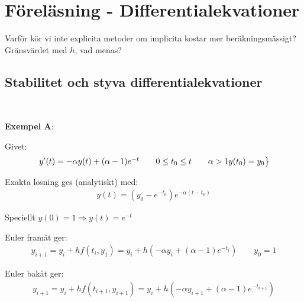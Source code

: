 \section{Föreläsning - Differentialekvationer}
\par\bigskip
\noindent Varför kör vi inte explicita metoder om implicita kostar mer beräkningsmässigt? Gränsvärdet med $h$, vad menas?
\par\bigskip
\subsection{Stabilitet och styva differentialekvationer}\hfill\\
\par\bigskip
\noindent \textbf{Exempel A}:
\par\bigskip
\noindent Givet:
\begin{equation*}
  \begin{gathered}
    \begin{rcases*}
      y^{\prime}(t)=-\alpha y(t)+(\alpha-1)e^{-t}\qquad 0\leq t_0\leq t\qquad\alpha > 1
      y(t_0)=y_0
    \end{rcases*}
  \end{gathered}
\end{equation*}
\par\bigskip
\noindent Exakta lösning ges (analytiskt) med:
\begin{equation*}
  \begin{gathered}
    y(t) = (y_0-e^{-t_0})e^{-\alpha(t-t_0)}
  \end{gathered}
\end{equation*}\par
\noindent Speciellt $y(0)=1\Rightarrow y(t)=e^{-t}$
\par\bigskip
\noindent Euler framåt ger:
\begin{equation*}
  \begin{gathered}
    y_{i+1} = y_i +hf(t_i,y_1) = y_i+h\left(-\alpha y_i+(\alpha-1)e^{-t_i}\right)\qquad y_0=1
  \end{gathered}
\end{equation*}
\par\bigskip
\noindent Euler bakåt ger:
\begin{equation*}
  \begin{gathered}
    y_{i+1} = y_i + hf(t_{i+1}, y_{i+1}) = y_i+h\left(-\alpha y_{i+1}+(\alpha-1)e^{-t_{i+1}}\right)
  \end{gathered}
\end{equation*}
\par\bigskip

